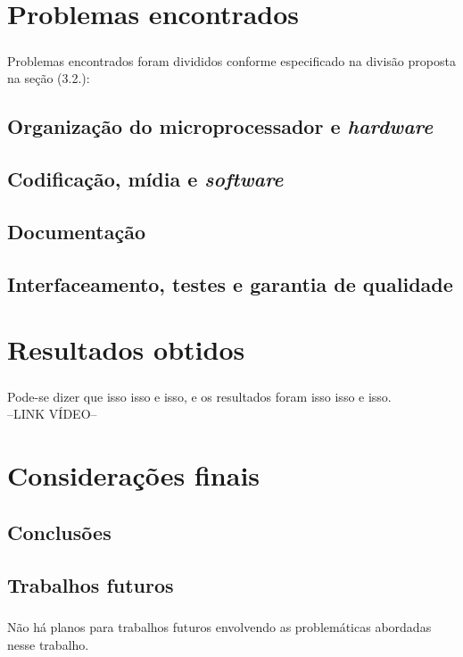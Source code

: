 \documentclass[notitlepage]{report}
\begin{document}
{\chapter{Problemas encontrados}
\paragraph{}{Problemas encontrados foram divididos conforme especificado na divisão proposta na seção (3.2.):}

\section{Organização do microprocessador e \textit{hardware}}
\section{Codificação, mídia e \textit{software}}
\section{Documentação}
\section{Interfaceamento, testes e garantia de qualidade}


\chapter{Resultados obtidos}
\paragraph{}{Pode-se dizer que isso isso e isso, e os resultados foram isso isso e isso. \\

--LINK VÍDEO--}

\chapter {Considerações finais}
\section{Conclusões}
\section{Trabalhos futuros}
\paragraph{}{Não há planos para trabalhos futuros envolvendo as problemáticas abordadas nesse trabalho.}

}
\end{document}
